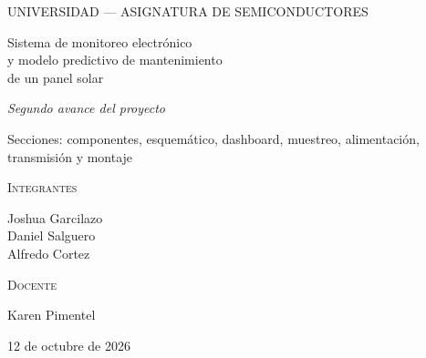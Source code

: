 \documentclass[10pt,letterpaper,twocolumn]{article}
\begin{document}
\begin{titlepage}
\thispagestyle{empty}
\centering
\vspace*{0.6in}
{\small UNIVERSIDAD --- ASIGNATURA DE SEMICONDUCTORES\par}
\vspace{2pt}{\footnotesize Aprendizaje Basado en Proyectos\par}
\vspace{0.9in}
{\fontsize{24}{29}\selectfont Sistema de monitoreo electrónico\\ y modelo predictivo de mantenimiento\\ de un panel solar\par}
\vspace{0.25in}
{\large\itshape Segundo avance del proyecto\par}
\vspace{4pt}{\small Fase 3 --- Diseño del circuito de adquisición\par}
{\small Secciones: componentes, esquemático, dashboard, muestreo, alimentación, transmisión y montaje\par}
\vspace{0.7in}
{\footnotesize\scshape Integrantes\par}\vspace{4pt}
{\small Joshua Garcilazo\\ Daniel Salguero\\ Alfredo Cortez\par}
\vspace{0.4in}
{\footnotesize\scshape Docente\par}\vspace{4pt}
{\small Karen Pimentel\par}
\vspace{0.4in}
{\small 12 de octubre de 2026\par}
\end{titlepage}
\setcounter{page}{2}
\end{document}
